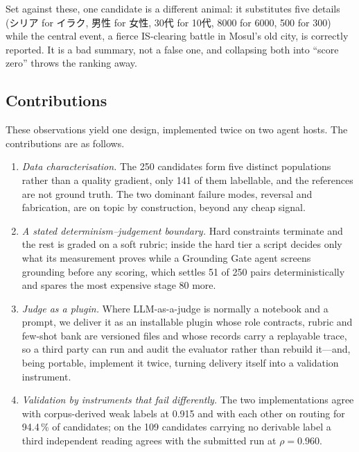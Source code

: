 \documentclass[conference]{IEEEtran}
\begin{document}
Set against these, one candidate is a different animal: it substitutes
five details (シリア for イラク, 男性 for 女性, 30代 for 10代, 8000 for
6000, 500 for 300) while the central event, a fierce IS-clearing battle in
Mosul's old city, is correctly reported. It is a bad summary, not a false
one, and collapsing both into ``score zero'' throws the ranking away.

\subsection{Contributions}
These observations yield one design, implemented twice on two agent
hosts. The contributions are as follows.

\begin{enumerate}
\setlength{\itemsep}{1.5pt}

\item \emph{Data characterisation.} The 250 candidates form five distinct
populations rather than a quality gradient, only 141 of them labellable,
and the references are not ground truth. The two dominant failure modes,
reversal and fabrication, are on topic by construction, beyond any cheap
signal.

\item \emph{A stated determinism--judgement boundary.} Hard constraints
terminate and the rest is graded on a soft rubric; inside the hard tier a
script decides only what its measurement proves while a Grounding Gate
agent screens grounding before any scoring, which settles 51 of 250 pairs
deterministically and spares the most expensive stage 80 more.

\item \emph{Judge as a plugin.} Where LLM-as-a-judge is normally a
notebook and a prompt, we deliver it as an installable plugin whose role
contracts, rubric and few-shot bank are versioned files and whose records
carry a replayable trace, so a third party can run and audit the evaluator
rather than rebuild it---and, being portable, implement it twice, turning
delivery itself into a validation instrument.

\item \emph{Validation by instruments that fail differently.} The two
implementations agree with corpus-derived weak labels at 0.915 and with
each other on routing for 94.4\,\% of candidates; on the 109 candidates
carrying no derivable label a third independent reading agrees with the
submitted run at $\rho = 0.960$.

\end{enumerate}
\end{document}
